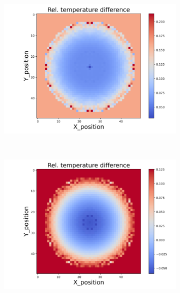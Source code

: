 \begin{figure}[h]
\begin{minipage}{\textwidth}
\begin{subfigure}{0.325\textwidth}
        \end{subfigure}
        \begin{subfigure}{0.325\textwidth}
            \centering
            \includegraphics[width=\textwidth]{figures/raw_data/21/lin_square/T_bias.jpg}
        \end{subfigure}
    \end{minipage}\\
    \begin{minipage}{\textwidth}
        \centering
        \begin{subfigure}{0.325\textwidth}
            \centering
            \includegraphics[width=\textwidth]{figures/raw_data/22/lin_square/T_bias.jpg}

\end{subfigure}
\end{minipage}
\end{figure}
